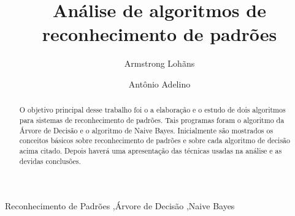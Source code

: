 \documentclass[preprint,12pt,times]{elsarticle}
\begin{document}
	\begin{frontmatter}



		\title{Análise de algoritmos de reconhecimento de padrões}


		\author[a]{Armstrong Lohãns}
		\address[a]{lohansdemelo1108@gmail.com}

		\author[b]{Antônio Adelino}
		\address[b]{antonio.asn03@gmail.com}

		\address{Garanhuns, Brasil}

		\begin{abstract}
			O objetivo principal desse trabalho foi o a elaboração e o estudo de dois algoritmos para sistemas de reconhecimento de padrões. Tais programas foram o algoritmo da Árvore de Decisão e o algoritmo de Naive Bayes. Inicialmente são mostrados os conceitos básicos sobre reconhecimento de padrões e sobre cada algoritmo de decisão acima citado. Depois haverá uma apresentação das técnicas usadas na análise e as devidas conclusões.
		\end{abstract}

		\begin{keyword}
			Reconhecimento de Padrões \sep Árvore de Decisão \sep Naive Bayes
		\end{keyword}

	\end{frontmatter}

	\linenumbers
\end{document}
